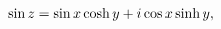 \[\mathop{\sin\/}\nolimits z=\mathop{\sin\/}\nolimits x\mathop{\cosh\/}\nolimits
y%
+i\mathop{\cos\/}\nolimits x\mathop{\sinh\/}\nolimits y,\]